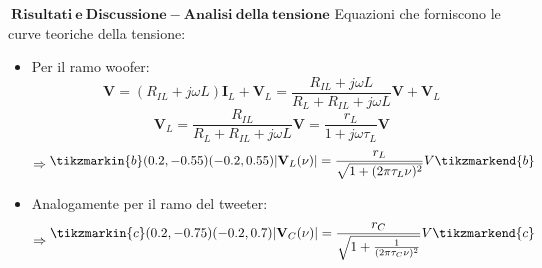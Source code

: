 \documentclass{beamer}
\begin{document}
\begin{frame}{$\mathbf{\ Risultati \ e \ Discussione - Analisi \ della \ tensione}$}
    Equazioni che forniscono le curve teoriche della tensione:
    \begin{itemize}
        \item <1-> Per il ramo woofer:
        \begin{equation*}
            \mathbf{V} = (R_{IL}+j\omega L)\mathbf{I}_L + \mathbf{V}_L=\frac{R_{IL}+j\omega L}{R_L+R_{IL}+j\omega L} \mathbf{V} + \mathbf{V}_L
        \end{equation*}
        \begin{equation*}
            \mathbf{V}_L=\frac{R_{IL}}{R_L+R_{IL}+j\omega L} \mathbf{V} =\frac{r_L}{1+j\omega \tau_L} \mathbf{V}
        \end{equation*}
        \begin{equation}
            \Rightarrow 
            \begin{split}
                \tikzmarkin{b}(0.2,-0.55)(-0.2,0.55)
                    |\mathbf{V}_L(\nu)|= \frac{r_L}{\sqrt{1+(2 \pi \tau_L \nu)^2}}V
                \tikzmarkend{b}
                \end{split}
        \end{equation}
        \item <2-> Analogamente per il ramo del tweeter:
        \begin{equation}
            \Rightarrow 
            \begin{split}
                \tikzmarkin{c}(0.2,-0.75)(-0.2,0.7)
                    |\mathbf{V}_C(\nu)|= \frac{r_C}{\sqrt{1+\frac{1}{(2 \pi \tau_C \nu)^2}}}V
                \tikzmarkend{c}
            \end{split}
        \end{equation}
    \end{itemize}
\end{frame}
\end{document}
